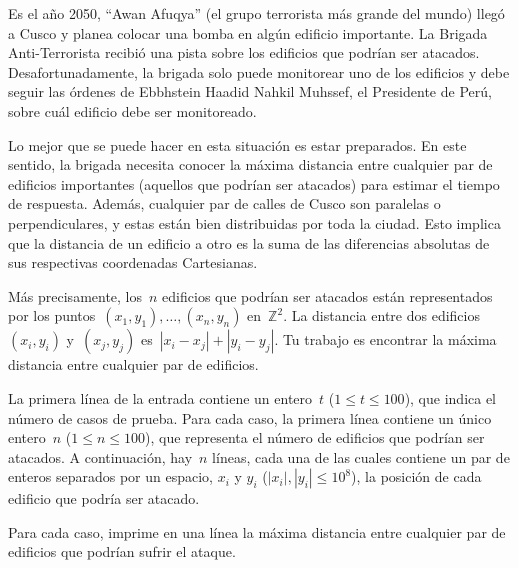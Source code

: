 
Es el año 2050, ``Awan Afuqya'' (el grupo terrorista más grande del mundo) llegó a
Cusco y planea colocar una bomba en algún edificio importante. La Brigada
Anti-Terrorista recibió una pista sobre los edificios que podrían ser
atacados. Desafortunadamente, la brigada solo puede monitorear uno de los edificios y
debe seguir las órdenes de Ebbhstein Haadid Nahkil Muhssef, el Presidente de Perú,
sobre cuál edificio debe ser monitoreado.

Lo mejor que se puede hacer en esta situación es estar preparados. En este sentido,
la brigada necesita conocer la máxima distancia entre cualquier par de edificios
importantes (aquellos que podrían ser atacados) para estimar el tiempo de
respuesta. Además, cualquier par de calles de Cusco son paralelas o perpendiculares,
y estas están bien distribuidas por toda la ciudad. Esto implica que la distancia de
un edificio a otro es la suma de las diferencias absolutas de sus respectivas
coordenadas Cartesianas.

Más precisamente, los~$n$ edificios que podrían ser atacados están representados por
los puntos~$(x_1, y_1), \dots, (x_n, y_n)$ en~$\mathbb{Z}^2$. La distancia entre dos
edificios~$(x_i, y_i)$ y~$(x_j, y_j)$ es~$|x_i - x_j| + |y_i - y_j|$. Tu trabajo es
encontrar la máxima distancia entre cualquier par de edificios.



La primera línea de la entrada contiene un entero~$t$ ($1 \leq t \leq 100$), que indica el
número de casos de prueba. Para cada caso, la primera línea contiene un único
entero~$n$ ($1 \leq n \leq 100$), que representa el número de edificios que podrían ser
atacados. A continuación, hay~$n$ líneas, cada una de las cuales contiene un par de
enteros separados por un espacio, $x_i$ y $y_i$ ($|x_i|, |y_i| \leq 10^8$), la posición
de cada edificio que podría ser atacado.

\outputText

Para cada caso, imprime en una línea la máxima distancia entre cualquier par de
edificios que podrían sufrir el ataque.

\exampleCases

